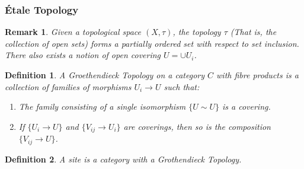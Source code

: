 \documentclass{article}
\theoremstyle{mystyle}
\newtheorem{definition}{Definition}[section]
\newtheorem{remark}{Remark}[section]
\begin{document}
\subsubsection{\'{E}tale Topology}
\begin{remark}
Given a topological space $(X,\tau)$, the topology $\tau$ (That is, the collection of open sets) forms a partially ordered set with respect to set inclusion. There also exists a notion of open covering $U = \cup U_i$.
\end{remark}
\begin{definition}
A Groethendieck Topology on a category $C$ with fibre products is a collection of families of morphisms $U_i \rightarrow U$ such that:
\begin{enumerate}
    \item The family consisting of a single isomorphism $\{U \sim U\}$ is a covering.
    \item If $\{U_i\rightarrow U\}$ and $\{V_{ij} \rightarrow U_i\}$ are coverings, then so is the composition $\{V_{ij}\rightarrow U\}$.
\end{enumerate}
\end{definition}
\begin{definition}
A site is a category with a Grothendieck Topology.
\end{definition}
\end{document}
